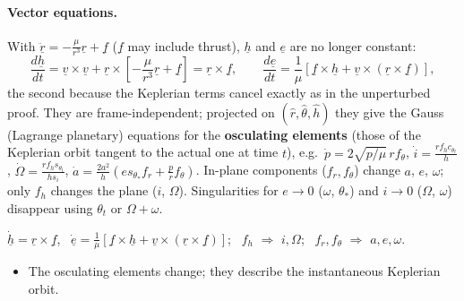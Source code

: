 \paragraph{Vector equations.} With $\ddot{\underline r}=-\frac{\mu}{r^3}\underline r+\underline f$ ($\underline f$ may include thrust), $\underline h$ and $\underline e$ are no longer constant:
\begin{equation}
\frac{d\underline h}{dt}=\underline v\times\underline v+\underline r\times\left[-\frac{\mu}{r^3}\underline r+\underline f\right]=\underline r\times\underline f,\qquad
\frac{d\underline e}{dt}=\frac1\mu\left[\underline f\times\underline h+\underline v\times(\underline r\times\underline f)\right],
\end{equation}
the second because the Keplerian terms cancel exactly as in the unperturbed proof. They are frame-independent; projected on $(\hat r,\hat\theta,\hat h)$
they give the Gauss (Lagrange planetary) equations for the \textbf{osculating elements} (those of the Keplerian orbit tangent to the actual one at time $t$), e.g.\
$\dot p=2\sqrt{p/\mu}\,rf_\theta$, $\dot i=\frac{rf_hc_{\theta_t}}{h}$, $\dot\Omega=\frac{rf_hs_{\theta_t}}{hs_i}$,
$\dot a=\frac{2a^2}{h}(es_{\theta_*}f_r+\frac prf_\theta)$. In-plane components ($f_r,f_\theta$) change $a$, $e$, $\omega$; only $f_h$ changes the plane
($i$, $\Omega$). Singularities for $e\to0$ ($\omega$, $\theta_*$) and $i\to0$ ($\Omega$, $\omega$) disappear using $\theta_t$ or $\Omega+\omega$.
\begin{keyf}
$\dot{\underline h}=\underline r\times\underline f$, \ $\dot{\underline e}=\frac1\mu[\underline f\times\underline h+\underline v\times(\underline r\times\underline f)]$; \ $f_h$ $\Rightarrow$ $i,\Omega$; \ $f_r,f_\theta$ $\Rightarrow$ $a,e,\omega$.
\end{keyf}
\pitfalls
\begin{itemize}
\item The osculating elements change; they describe the instantaneous Keplerian orbit.
\end{itemize}

